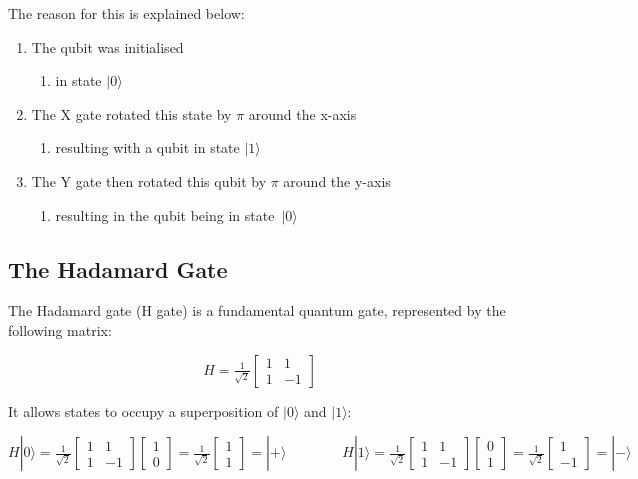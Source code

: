 The reason for this is explained below:
\begin{enumerate}
    \item The qubit was initialised 
    \begin{enumerate}
        \item in state $|0\rangle$
    \end{enumerate}
    \item The X gate rotated this state by $\pi$ around the x-axis
    \begin{enumerate}
        \item resulting with a qubit in state $|1\rangle$
    \end{enumerate}
    \item The Y gate then rotated this qubit by $\pi$ around the y-axis
    \begin{enumerate}
        \item resulting in the qubit being in state~$|0\rangle$
    \end{enumerate} 
\end{enumerate}

\subsection{The Hadamard Gate}
The Hadamard gate (H gate) is a fundamental quantum gate, represented by the following matrix:

$$ H = \tfrac{1}{\sqrt{2}}\begin{bmatrix} 1 & 1 \\ 1 & -1 \end{bmatrix} $$

It allows states to occupy a superposition of $|0\rangle$ and $|1\rangle$:

$$ H|0\rangle = \tfrac{1}{\sqrt{2}}\begin{bmatrix} 1 & 1 \\ 1 & -1 \end{bmatrix}\begin{bmatrix} 1 \\ 0 \end{bmatrix} = \tfrac{1}{\sqrt{2}} \begin{bmatrix} 1 \\ 1 \end{bmatrix}= |+\rangle 
\quad \quad \quad \quad 
H|1\rangle = \tfrac{1}{\sqrt{2}}\begin{bmatrix} 1 & 1 \\ 1 & -1 \end{bmatrix}\begin{bmatrix} 0 \\ 1 \end{bmatrix} = \tfrac{1}{\sqrt{2}} \begin{bmatrix} 1 \\ -1 \end{bmatrix}= |-\rangle $$

